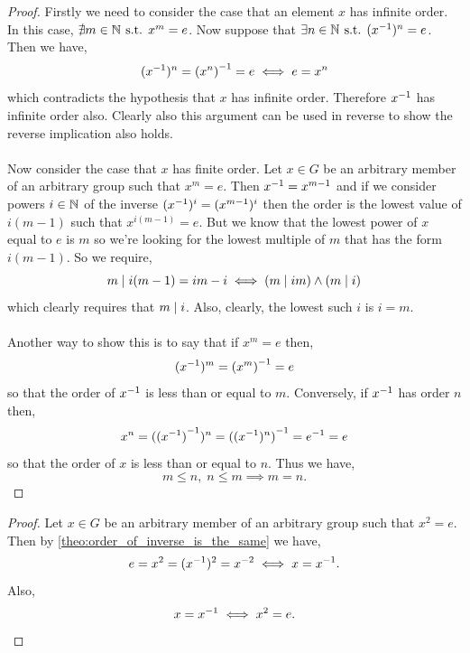 \documentclass[MathsNotesBase.tex]{subfiles}
\begin{document}
{		
		\begin{proof}
			Firstly we need to consider the case that an element $x$ has infinite order. In this case, ${ \nexists m \in \mathbb{N}^{} \text{ s.t. } x^m = e }$. Now suppose that ${ \exists n \in \mathbb{N}^{} \text{ s.t. } ({x}^{-1})^n = e }$. Then we have,
			\[ ({x}^{-1})^n = {(x^n)}^{-1} = e \iff e = x^n \]
			which contradicts the hypothesis that $x$ has infinite order. Therefore ${ {x}^{-1} }$ has infinite order also. Clearly also this argument can be used in reverse to show the reverse implication also holds.\\\\
			Now consider the case that $x$ has finite order. Let ${ x \in G }$ be an arbitrary member of an arbitrary group such that ${ x^m = e }$. Then ${ {x}^{-1} = x^{m-1} }$ and if we consider powers ${ i \in \mathbb{N}^{} }$ of the inverse ${ ({x}^{-1})^i = (x^{m-1})^i }$ then the order is the lowest value of ${ i(m-1) }$ such that ${ x^{i(m-1)} = e }$. But we know that the lowest power of $x$ equal to $e$ is $m$ so we're looking for the lowest multiple of $m$ that has the form ${ i(m-1) }$. So we require,
			\[ m \mid i(m-1) = im - i \iff (m \mid im) \land (m \mid i) \]
			which clearly requires that ${ m \mid i }$. Also, clearly, the lowest such $i$ is ${ i = m }$.\\\\
			Another way to show this is to say that if ${ x^m = e }$ then,
			\[ ({x}^{-1})^m = {(x^m)}^{-1} = e \]
			so that the order of ${ {x}^{-1} }$ is less than or equal to $m$. Conversely, if ${ {x}^{-1} }$ has order $n$ then,
			\[ x^n = ({({x}^{-1})}^{-1})^n = {(({x}^{-1})^n)}^{-1} = {e}^{-1} = e \]
			so that the order of ${ x }$ is less than or equal to $n$. Thus we have,
			\[ m \leq n,\; n \leq m \implies m = n. \]
		\end{proof}
	
		\begin{proof}
			Let ${ x \in G }$ be an arbitrary member of an arbitrary group such that ${ x^2 = e }$. Then by \autoref{theo:order_of_inverse_is_the_same} we have,
			\[ e = x^2 = ({x}^{-1})^2 = x^{-2} \iff x = {x}^{-1}. \]
			Also,
			\[  x = {x}^{-1} \iff x^2 = e. \]
		\end{proof}
	
}
\end{document}
